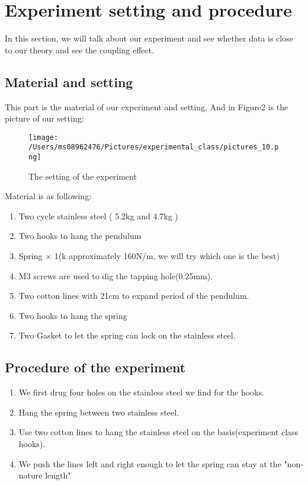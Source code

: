 \documentclass[final,1p,11pt]{elsarticle}
\begin{document}
\section{Experiment setting and procedure}
In this section, we will talk about our experiment and see whether data is close to our theory and see the coupling effect.\\ 
\subsection{Material and setting}
This part is the material of our experiment and setting. And in Figure2 is the picture of our setting:
\begin{figure}
\caption{The setting of the experiment}
\centering
\texttt{[image: /Users/ms08962476/Pictures/experimental\_class/pictures\_10.png]}
\end{figure} 

Material is as following:
\begin{enumerate}
\item Two cycle stainless steel ( 5.2kg and 4.7kg )
\item Two hooks to hang the pendulum
\item Spring \(\times\) 1(k approximately 160N/m, we will try which one is the best)
\item M3 screws are used to dig the tapping hole(0.25mm).
\item Two cotton lines with 21cm to expand period of the pendulum.
\item Two hooks to hang the spring
\item Two Gasket to let the spring can lock on the stainless steel.
\end{enumerate} 

\subsection{Procedure of the experiment}
\begin{enumerate}
\item We first drug four holes on the stainless steel we find for the hooks.
\item Hang the spring between two stainless steel.
\item Use two cotton lines to hang the stainless steel on the basis(experiment class hooks).
\item We push the lines left and right enough to let the spring can stay at the "non-nature length"
\end{enumerate} 
\end{document}
